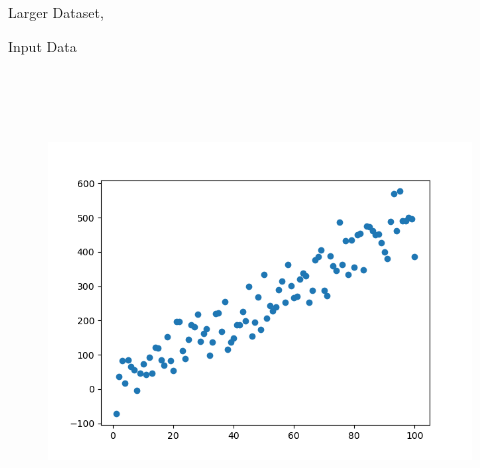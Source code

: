 \documentclass[12pt]{article}
\renewcommand{\_}{\kern-1.5pt\textunderscore\kern-1.5pt}
\begin{document}
\begin{enumerate}
\begin{table}[H]
\begin{tabular}{p{1.96in}p{1.96in}p{1.96in}}
\end{tabular}
 \end{table}




\vspace{\baselineskip}
\textcolor[HTML]{222222}{Larger Dataset, }\par

\textcolor[HTML]{222222}{Input Data}\par




\begin{figure}[H]
	\begin{Center}
		\includegraphics[width=6.4in,height=4.81in]{./media/image36.png}
	\end{Center}
\end{figure}



\par


\vspace{\baselineskip}

\vspace{\baselineskip}

\vspace{\baselineskip}


\end{enumerate}
\end{document}
